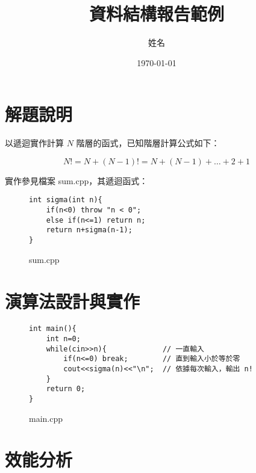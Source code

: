 \documentclass[12pt]{report}
\title{資料結構報告範例}
\author{姓名}
\date{\today}
\begin{document}
\maketitle
\tableofcontents
\clearpage

\chapter{解題說明}

\hspace*{2em}以遞迴實作計算 $N$ 階層的函式，已知階層計算公式如下：

$$N! = N + (N-1)! = N + (N-1) + \dots + 2 + 1$$

實作參見檔案 sum.cpp，其遞迴函式：

\begin{figure}[ht]
    \begin{verbatim}
int sigma(int n){
    if(n<0) throw "n < 0";
    else if(n<=1) return n;
    return n+sigma(n-1);
}
    \end{verbatim}

    \captionsetup{justification=centering}
    \caption{sum.cpp}
    \label{fig:sum.cpp}
\end{figure}

\chapter{演算法設計與實作}

\begin{figure}[ht]
    \begin{verbatim}
int main(){
    int n=0;
    while(cin>>n){             // 一直輸入
        if(n<=0) break;        // 直到輸入小於等於零
        cout<<sigma(n)<<"\n";  // 依據每次輸入，輸出 n!
    }
    return 0;
}
    \end{verbatim}

    \captionsetup{justification=centering}
    \caption{main.cpp}
    \label{fig:main.cpp}
\end{figure}

\chapter{效能分析}
\end{document}
